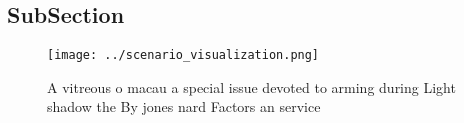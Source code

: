 \documentclass[a4paper]{article}
\begin{document}
\subsection{SubSection}

\begin{figure}
\centering
\texttt{[image: ../scenario\_visualization.png]}
\caption{A vitreous o macau a special issue devoted to arming during Light shadow the By jones nard Factors an service
}
\end{figure}
 
\end{document}
